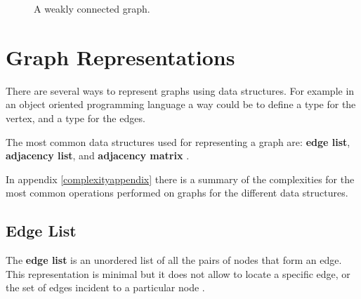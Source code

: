 \begin{figure}[H]
\centering
{}  
\caption[A weakly connected graph.]{A weakly connected graph.}
\label{graphs_2}
\end{figure}

\section{Graph Representations}
There are several ways to represent graphs using data structures. For example in an object oriented programming language a way could be to define a type for the vertex, and a type for the edges.

The most common data structures used for representing a graph are: \textbf{edge list}, \textbf{adjacency list}, and \textbf{adjacency matrix} \cite{goodrich2013data}. 

In appendix \ref{complexityappendix} there is a summary of the complexities for the most common operations performed on graphs for the different data structures.

\subsection{Edge List}
The \textbf{edge list} is an unordered list of all the pairs of nodes that form an edge. This representation is minimal but it does not allow to locate a specific edge, or the set of edges incident to a particular node \cite{goodrich2013data}.

